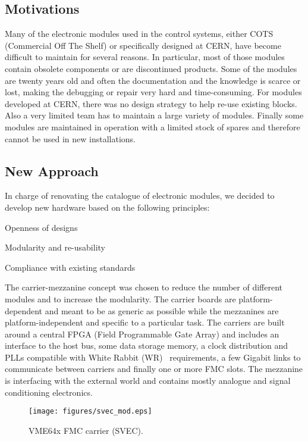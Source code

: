 \documentclass{JAC2003}
\begin{document}
\subsection{Motivations}
Many of the electronic modules used in the control systems, either COTS (Commercial Off The Shelf) or specifically designed at CERN, have become difficult to maintain for several reasons.
In particular, most of those modules contain obsolete components or are discontinued products.
Some of the modules are twenty years old and often the documentation and the knowledge is scarce or lost, making the debugging or repair very hard and time-consuming.
For modules developed at CERN, there was no design strategy to help re-use existing blocks.
Also a very limited team has to maintain a large variety of modules.
Finally some modules are maintained in operation with a limited stock of spares and therefore cannot be used in new installations.

\subsection{New Approach}
In charge of renovating the catalogue of electronic modules, we decided to develop new hardware based on the following principles:
\begin{Itemize}
\item Openness of designs
\item Modularity and re-usability
\item Compliance with existing standards
\end{Itemize}

The carrier-mezzanine concept was chosen to reduce the number of different modules and to increase the modularity.
The carrier boards are platform-dependent and meant to be as generic as possible while the mezzanines are platform-independent and specific to a particular task.
The carriers are built around a central FPGA (Field Programmable Gate Array) and includes an interface to the host bus, some data storage memory, a clock distribution and PLLs compatible with White Rabbit (WR)~\cite{wr} requirements, a few Gigabit links to communicate between carriers and finally one or more FMC slots.
The mezzanine is interfacing with the external world and contains mostly analogue and signal conditioning electronics.

\begin{figure}[htb]
   \centering
   \texttt{[image: figures/svec\_mod.eps]}
   \caption{VME64x FMC carrier (SVEC).}
   \label{svec}
\end{figure}
\end{document}
